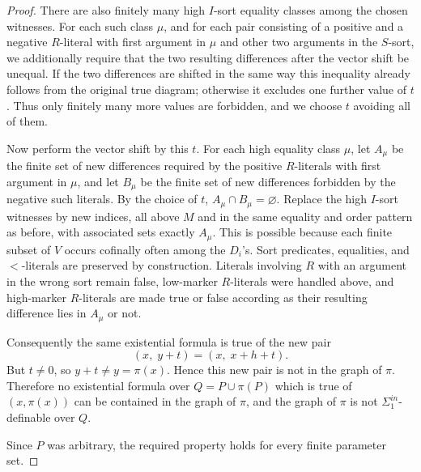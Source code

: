 \documentclass[12pt]{article}
\begin{document}
\begin{proof}
There are also finitely many high $I$-sort equality classes among the
chosen witnesses.  For each such class $\mu$, and for each pair
consisting of a positive and a negative $R$-literal with first argument
in $\mu$ and other two arguments in the $S$-sort, we additionally require
that the two resulting differences after the vector shift be unequal.
If the two differences are shifted in the same way this inequality
already follows from the original true diagram; otherwise it excludes
one further value of $t$.  Thus only finitely many more values are
forbidden, and we choose $t$ avoiding all of them.

Now perform the vector shift by this $t$.  For each high equality class
$\mu$, let $A_\mu$ be the finite set of new differences required by the
positive $R$-literals with first argument in $\mu$, and let $B_\mu$ be
the finite set of new differences forbidden by the negative such
literals.  By the choice of $t$, $A_\mu\cap B_\mu=\varnothing$.  Replace
the high $I$-sort witnesses by new indices, all above $M$ and in the
same equality and order pattern as before, with associated sets exactly
$A_\mu$.  This is possible because each finite subset of $V$ occurs
cofinally often among the $D_i$'s.  Sort predicates, equalities, and
$<$-literals are preserved by construction.  Literals involving $R$ with
an argument in the wrong sort remain false, low-marker $R$-literals were
handled above, and high-marker $R$-literals are made true or false
according as their resulting difference lies in $A_\mu$ or not.

Consequently the same existential formula is true of the new pair
\[
        (x,\;y+t)=(x,\;x+h+t).
\]
But $t\neq0$, so $y+t\neq y=\pi(x)$.  Hence this new pair is not in the
graph of $\pi$.  Therefore no existential formula over
$Q=P\cup\pi(P)$ which is true of $(x,\pi(x))$ can be contained in the
graph of $\pi$, and the graph of $\pi$ is not
$\Sigma^{in}_1$-definable over $Q$.

Since $P$ was arbitrary, the required property holds for every finite
parameter set.
\end{proof}
\end{document}
